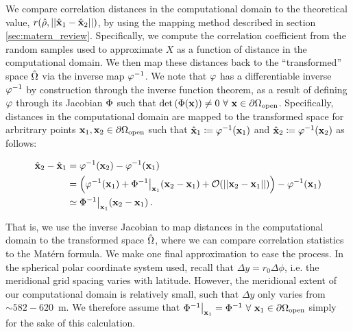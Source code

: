 We compare correlation distances in the computational domain to the
theoretical value, $r(\hat{\rho},||\hat{\mathbf{x}}_1-\hat{\mathbf{x}}_2||)$, by using the mapping method described in
section \ref{sec:matern_review}.
Specifically, we compute the correlation coefficient from the random samples
used to approximate $X$ as a function of distance in the computational domain.
We then map these distances back to the ``transformed'' space $\hat{\Omega}$ via
the inverse map $\varphi^{-1}$.
We note that $\varphi$ has a differentiable inverse $\varphi^{-1}$ by construction
through the inverse function theorem,
as a result of defining $\varphi$ through its Jacobian $\Phi$ such that
$\text{det}\left(\Phi(\mathbf{x})\right) \neq 0 \,\,\forall \,\,\mathbf{x}\in\partial\Omega_{\text{open}}$.
Specifically, distances in the computational domain are mapped to the
transformed space for arbritrary points $\mathbf{x}_1,\mathbf{x}_2\in\partial\Omega_{\text{open}}$ such that
$\hat{\mathbf{x}}_1\coloneqq\varphi^{-1}(\mathbf{x}_1)$ and $\hat{\mathbf{x}}_2\coloneqq \varphi^{-1}(\mathbf{x}_2)$ as
follows:
\begin{linenomath*}\begin{equation*}
    \begin{aligned}
        \hat{\mathbf{x}}_2 - \hat{\mathbf{x}}_1 &= \varphi^{-1}(\mathbf{x}_2) - \varphi^{-1}(\mathbf{x}_1) \\
                      &= \left(
                            \varphi^{-1}(\mathbf{x}_1) +
                            \Phi^{-1}\big|_{\mathbf{x}_{1}}(\mathbf{x}_2-\mathbf{x}_1) +
                            \mathcal{O}( ||\mathbf{x}_2-\mathbf{x}_1|| )
                        \right) - \varphi^{-1}(\mathbf{x}_1) \\
                        &\simeq \Phi^{-1}\big|_{\mathbf{x}_{1}}(\mathbf{x}_2-\mathbf{x}_1) \, .
    \end{aligned}
    \label{eq:matern_correlation_iso}
\end{equation*}\end{linenomath*}
That is, we use the inverse Jacobian to map distances in the computational domain to the
transformed space $\hat{\Omega}$, where we can compare correlation statistics to
the Mat\'ern formula.
We make one final approximation to ease the process.
In the spherical polar coordinate system used, recall that
$\Delta y = r_0 \Delta \phi$, i.e. the meridional grid spacing varies with
latitude.
However, the meridional extent of our computational domain is relatively small,
such that $\Delta y$ only varies from $\sim 582-620$~m.
We therefore assume that
$\Phi^{-1}\big|_{\mathbf{x}_{1}} =\Phi^{-1}\,\,\forall\,\,\mathbf{x}_1\in\partial\Omega_{\text{open}}$
simply for the sake of this calculation.

